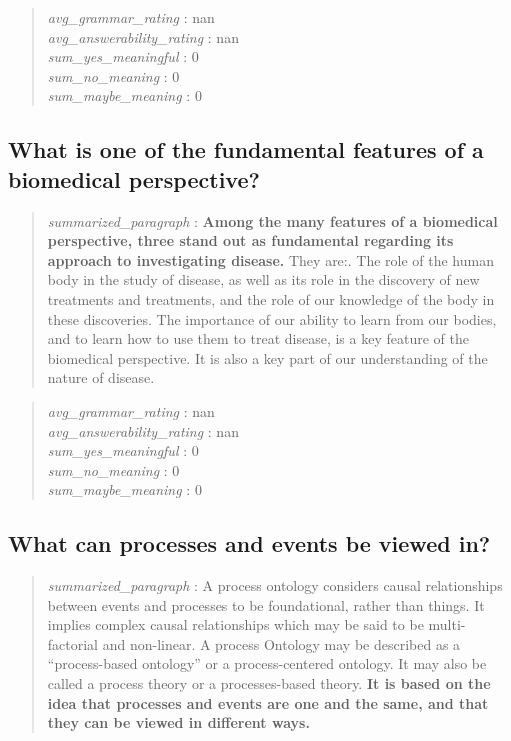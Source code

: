 \begin{quote}
\emph{avg\_grammar\_rating} : nan\\
\emph{avg\_answerability\_rating} : nan\\
\emph{sum\_yes\_meaningful} : 0\\
\emph{sum\_no\_meaning} : 0\\
\emph{sum\_maybe\_meaning} : 0
\end{quote}

\hypertarget{what-is-one-of-the-fundamental-features-of-a-biomedical-perspective-1}{%
\subsection{What is one of the fundamental features of a biomedical
perspective?}\label{what-is-one-of-the-fundamental-features-of-a-biomedical-perspective-1}}

\begin{quote}
\emph{summarized\_paragraph} : \textbf{Among the many features of a
biomedical perspective, three stand out as fundamental regarding its
approach to investigating disease.} They are:. The role of the human
body in the study of disease, as well as its role in the discovery of
new treatments and treatments, and the role of our knowledge of the body
in these discoveries. The importance of our ability to learn from our
bodies, and to learn how to use them to treat disease, is a key feature
of the biomedical perspective. It is also a key part of our
understanding of the nature of disease.
\end{quote}

\begin{quote}
\emph{avg\_grammar\_rating} : nan\\
\emph{avg\_answerability\_rating} : nan\\
\emph{sum\_yes\_meaningful} : 0\\
\emph{sum\_no\_meaning} : 0\\
\emph{sum\_maybe\_meaning} : 0
\end{quote}

\hypertarget{what-can-processes-and-events-be-viewed-in}{%
\subsection{What can processes and events be viewed
in?}\label{what-can-processes-and-events-be-viewed-in}}

\begin{quote}
\emph{summarized\_paragraph} : A process ontology considers causal
relationships between events and processes to be foundational, rather
than things. It implies complex causal relationships which may be said
to be multi-factorial and non-linear. A process Ontology may be
described as a ``process-based ontology'' or a process-centered
ontology. It may also be called a process theory or a processes-based
theory. \textbf{It is based on the idea that processes and events are
one and the same, and that they can be viewed in different ways.}
\end{quote}


